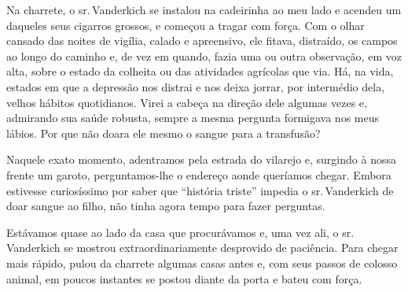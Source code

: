 Na charrete, o sr.\,Vanderkich se instalou na cadeirinha ao meu lado e
acendeu um daqueles seus cigarros grossos, e começou a tragar com força.
Com o olhar cansado das noites de vigília, calado e apreensivo, ele
fitava, distraído, os campos ao longo do caminho e, de vez em quando,
fazia uma ou outra observação, em voz alta, sobre o estado da colheita
ou das atividades agrícolas que via. Há, na vida, estados em que a
depressão nos distrai e nos deixa jorrar, por intermédio dela, velhos
hábitos quotidianos. Virei a cabeça na direção dele algumas vezes e,
admirando sua saúde robusta, sempre a mesma pergunta formigava nos meus
lábios. Por que não doara ele mesmo o sangue para a transfusão?




Naquele exato momento, adentramos pela estrada do vilarejo e, surgindo à
nossa frente um garoto, perguntamos-lhe o endereço aonde queríamos
chegar. Embora estivesse curiosíssimo por saber que ``história triste''
impedia o sr.\,Vanderkich de doar sangue ao filho, não tinha agora tempo
para fazer perguntas.

Estávamos quase ao lado da casa que procurávamos e, uma vez ali, o
sr.\,Vanderkich se mostrou extraordinariamente desprovido de paciência.
Para chegar mais rápido, pulou da charrete algumas casas antes e, com
seus passos de colosso animal, em poucos instantes se postou diante da
porta e bateu com força.





